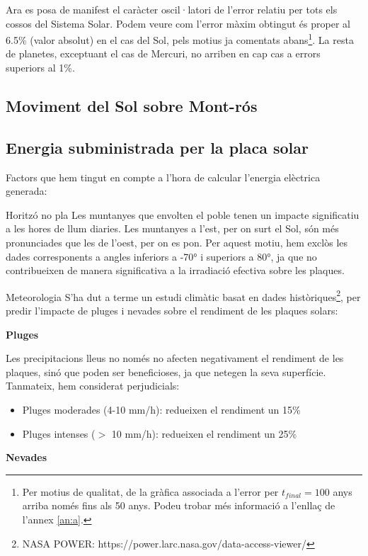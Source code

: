 \documentclass[10pt, twoside, a4paper]{article}
\begin{document}
Ara es posa de manifest el caràcter oscil·latori de l'error relatiu per tots els cossos del Sistema Solar. Podem veure com l'error màxim obtingut és proper al 6.5\% (valor absolut) en el cas del Sol, pels motius ja comentats abans\footnote{Per motius de qualitat, de la gràfica associada a l'error per $t_{final}=100$ anys arriba només fins als 50 anys. Podeu trobar més informació a l'enllaç de l'annex \ref{an:a}.}. La resta de planetes, exceptuant el cas de Mercuri, no arriben en cap cas a errors superiors al 1\%.




\subsection{Moviment del Sol sobre Mont-rós}


\subsection{Energia subministrada per la placa solar}

Factors que hem tingut en compte a l'hora de calcular l'energia elèctrica generada: 

Horitzó no pla
Les muntanyes que envolten el poble tenen un impacte significatiu a les hores de llum diaries. Les muntanyes a l'est, per on surt el Sol, són més pronunciades que les de l'oest, per on es pon. Per aquest motiu, hem exclòs les dades corresponents a angles inferiors a -70° i superiors a 80°, ja que no contribueixen de manera significativa a la irradiació efectiva sobre les plaques.

Meteorologia 
S'ha dut a terme un estudi climàtic basat en dades històriques\footnote{NASA POWER: https://power.larc.nasa.gov/data-access-viewer/}, per predir l'impacte de pluges i nevades sobre el rendiment de les plaques solars:

\textbf{Pluges}

Les precipitacions lleus no només no afecten negativament el rendiment de les plaques, sinó que poden ser beneficioses, ja que netegen la seva superfície. Tanmateix, hem considerat perjudicials:
\begin{itemize}
    \item Pluges moderades (4-10 mm/h): redueixen el rendiment un 15\%
    \item Pluges intenses ($>$ 10 mm/h): redueixen el rendiment un 25\%
\end{itemize}
     
\textbf{Nevades}
\end{document}
